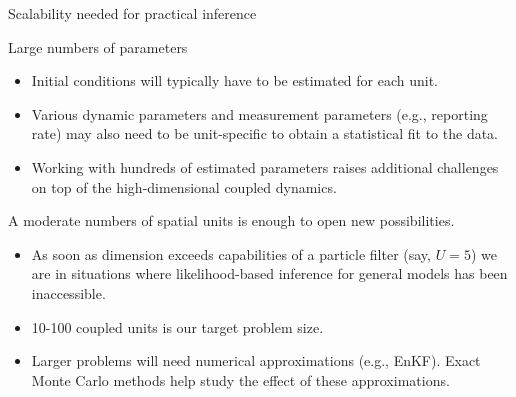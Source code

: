 \documentclass{beamer}
\begin{document}
\begin{frame}{Scalability needed for practical inference}

Large numbers of parameters
  \begin{itemize}
  \item  Initial conditions will typically have to be estimated for each unit.
  \item Various dynamic parameters and measurement parameters (e.g., reporting rate) may also need to be unit-specific to obtain a statistical fit to the data.
\item Working with hundreds of estimated parameters raises additional challenges on top of the high-dimensional coupled dynamics.
  \end{itemize}

\vspace{5mm}
  
A moderate numbers of spatial units is enough to open new possibilities.

  \begin{itemize}
  \item As soon as dimension exceeds capabilities of a particle filter (say, $U=5$) we are in situations where likelihood-based inference for general models has been inaccessible.

  \item 10-100 coupled units is our target problem size.

  \item Larger problems will need numerical approximations (e.g., EnKF). Exact Monte Carlo methods help study the effect of these approximations.
    
  \end{itemize}

  \end{frame}
\end{document}
